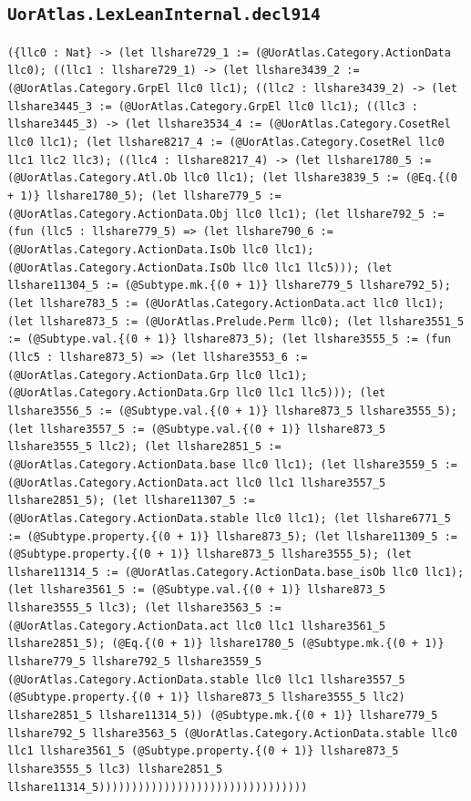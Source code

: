 \documentclass[11pt]{article}
\begin{document}
\subsection*{\texttt{UorAtlas.LexLeanInternal.decl914}}
\noindent\texttt{(\{llc0 : Nat\} -> (let llshare729\_1 := (@UorAtlas.Category.ActionData llc0); ((llc1 : llshare729\_1) -> (let llshare3439\_2 := (@UorAtlas.Category.GrpEl llc0 llc1); ((llc2 : llshare3439\_2) -> (let llshare3445\_3 := (@UorAtlas.Category.GrpEl llc0 llc1); ((llc3 : llshare3445\_3) -> (let llshare3534\_4 := (@UorAtlas.Category.CosetRel llc0 llc1); (let llshare8217\_4 := (@UorAtlas.Category.CosetRel llc0 llc1 llc2 llc3); ((llc4 : llshare8217\_4) -> (let llshare1780\_5 := (@UorAtlas.Category.Atl.Ob llc0 llc1); (let llshare3839\_5 := (@Eq.\{(0 + 1)\} llshare1780\_5); (let llshare779\_5 := (@UorAtlas.Category.ActionData.Obj llc0 llc1); (let llshare792\_5 := (fun (llc5 : llshare779\_5) => (let llshare790\_6 := (@UorAtlas.Category.ActionData.IsOb llc0 llc1); (@UorAtlas.Category.ActionData.IsOb llc0 llc1 llc5))); (let llshare11304\_5 := (@Subtype.mk.\{(0 + 1)\} llshare779\_5 llshare792\_5); (let llshare783\_5 := (@UorAtlas.Category.ActionData.act llc0 llc1); (let llshare873\_5 := (@UorAtlas.Prelude.Perm llc0); (let llshare3551\_5 := (@Subtype.val.\{(0 + 1)\} llshare873\_5); (let llshare3555\_5 := (fun (llc5 : llshare873\_5) => (let llshare3553\_6 := (@UorAtlas.Category.ActionData.Grp llc0 llc1); (@UorAtlas.Category.ActionData.Grp llc0 llc1 llc5))); (let llshare3556\_5 := (@Subtype.val.\{(0 + 1)\} llshare873\_5 llshare3555\_5); (let llshare3557\_5 := (@Subtype.val.\{(0 + 1)\} llshare873\_5 llshare3555\_5 llc2); (let llshare2851\_5 := (@UorAtlas.Category.ActionData.base llc0 llc1); (let llshare3559\_5 := (@UorAtlas.Category.ActionData.act llc0 llc1 llshare3557\_5 llshare2851\_5); (let llshare11307\_5 := (@UorAtlas.Category.ActionData.stable llc0 llc1); (let llshare6771\_5 := (@Subtype.property.\{(0 + 1)\} llshare873\_5); (let llshare11309\_5 := (@Subtype.property.\{(0 + 1)\} llshare873\_5 llshare3555\_5); (let llshare11314\_5 := (@UorAtlas.Category.ActionData.base\_isOb llc0 llc1); (let llshare3561\_5 := (@Subtype.val.\{(0 + 1)\} llshare873\_5 llshare3555\_5 llc3); (let llshare3563\_5 := (@UorAtlas.Category.ActionData.act llc0 llc1 llshare3561\_5 llshare2851\_5); (@Eq.\{(0 + 1)\} llshare1780\_5 (@Subtype.mk.\{(0 + 1)\} llshare779\_5 llshare792\_5 llshare3559\_5 (@UorAtlas.Category.ActionData.stable llc0 llc1 llshare3557\_5 (@Subtype.property.\{(0 + 1)\} llshare873\_5 llshare3555\_5 llc2) llshare2851\_5 llshare11314\_5)) (@Subtype.mk.\{(0 + 1)\} llshare779\_5 llshare792\_5 llshare3563\_5 (@UorAtlas.Category.ActionData.stable llc0 llc1 llshare3561\_5 (@Subtype.property.\{(0 + 1)\} llshare873\_5 llshare3555\_5 llc3) llshare2851\_5 llshare11314\_5))))))))))))))))))))))))))))))))}\par
\end{document}
